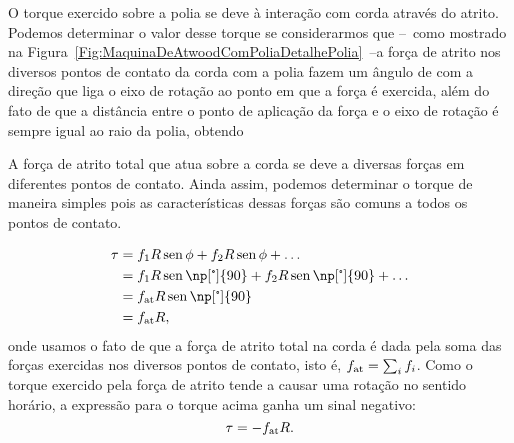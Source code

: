 O torque exercido sobre a polia se deve à interação com corda através do atrito. Podemos determinar o valor desse torque se considerarmos que --~como mostrado na Figura~\ref{Fig:MaquinaDeAtwoodComPoliaDetalhePolia}~--a força de atrito nos diversos pontos de contato da corda com a polia fazem um ângulo de  com a direção que liga o eixo de rotação ao ponto em que a força é exercida, além do fato de que a distância entre o ponto de aplicação da força e o eixo de rotação é sempre igual ao raio da polia, obtendo
%
\begin{marginfigure}
\centering
{}
\caption{A força de atrito total que atua sobre a corda se deve a diversas forças em diferentes pontos de contato. Ainda assim, podemos determinar o torque de maneira simples pois as características dessas forças são comuns a todos os pontos de contato. \label{Fig:MaquinaDeAtwoodComPoliaDetalhePolia}}
\end{marginfigure}
%
\begin{align}
    \tau &= f_1 R \sen\phi + f_2 R \sen\phi + \dots \\
    &= f_1 R \sen\np[\tcdegree]{90} + f_2 R \sen\np[\tcdegree]{90} + \dots \\
    &= f_{\rm{at}} R \sen\np[\tcdegree]{90} \\
    &= f_{\rm{at}} R,
\end{align}
%
onde usamos o fato de que a força de atrito total na corda é dada pela soma das forças exercidas nos diversos pontos de contato, isto é, $f_{\rm{at}} = \sum_{i} f_i$. Como o torque exercido pela força de atrito tende a causar uma rotação no sentido horário, a expressão para o torque acima ganha um sinal negativo:
\begin{equation}
    \tau = - f_{\rm{at}} R.
\end{equation}

